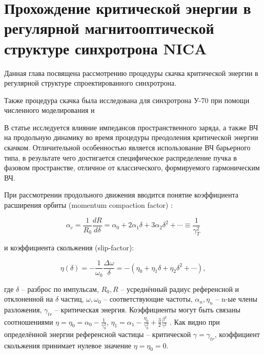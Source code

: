 
	\chapter{Прохождение критической энергии в регулярной магнитооптической структуре синхротрона NICA}\label{ch:transition_jump}

\par Данная глава посвящена рассмотрению процедуры скачка критической энергии в регулярной структуре спроектированного синхротрона.

\par Также процедура скачка была исследована для синхротрона У-70 при помощи численного моделирования и 

\par В статье исследуется влияние импедансов пространственного заряда, а также ВЧ на продольную динамику во время процедуры преодоления критической энергии скачком. Отличительной особенностью является использование ВЧ барьерного типа, в результате чего достигается специфическое распределение пучка в фазовом пространстве, отличное от классического, формируемого гармоническим ВЧ.

\par При рассмотрении продольного движения вводится понятие коэф\-фи\-ци\-ента
расширения орбиты (momentum compaction factor) \cite{lee}:

\begin{equation}
\alpha_c=\frac{1}{R_0} \frac{d R}{d \delta}=\alpha_0+2 \alpha_1 \delta+3 \alpha_2 \delta^2+\cdots \equiv \frac{1}{\gamma_T^2}
\label{alpha}
\end{equation}

и коэффициента скольжения (slip-factor):

\begin{equation}
\eta(\delta)=-\frac{1}{\omega_0} \frac{\Delta \omega}{\delta}=-\left(\eta_0+\eta_1 \delta+\eta_2 \delta^2+\cdots\right),
\label{eta}
\end{equation}

где $\delta$ – разброс по импульсам, $R_{0},R$ – усреднённый радиус референсной и отклоненной на $\delta$ частиц, $\omega, \omega_{0}$ – соответствующие частоты, $\alpha_n, \eta_n$ – n-ые члены разложения, $\gamma_{tr}$ – критическая энергия. Коэффициенты могут быть связаны соотношениями $\eta=\eta_{0}=\alpha_{0}-\frac{1}{\gamma_{0}^{2}}$, $\eta_{1}=\alpha_{1}-\frac{\eta_{0}}{\gamma_{0}^{2}}+\frac{3}{2} \frac{\beta^{2}}{\gamma^{2}}$ . Как видно при определённой энергии референсной частицы -- критической $\gamma = \gamma_{tr}$, коэффициент скольжения принимает нулевое значение $\eta = \eta_{0} = 0$.

